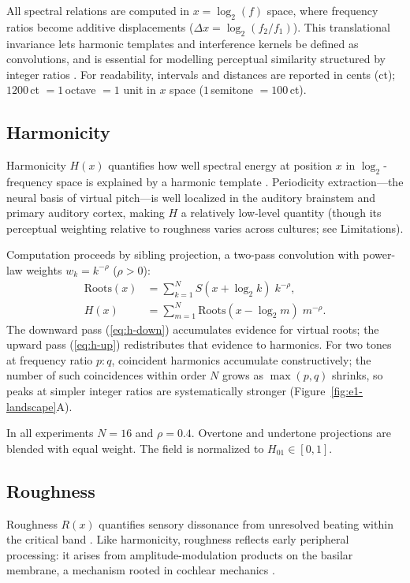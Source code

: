 \documentclass[letterpaper]{article}
\begin{document}
All spectral relations are computed in $x = \log_2(f)$ space, where frequency ratios become additive displacements ($\Delta x = \log_2(f_2/f_1)$). This translational invariance lets harmonic templates and interference kernels be defined as convolutions, and is essential for modelling perceptual similarity structured by integer ratios \citep{glasberg1990}. For readability, intervals and distances are reported in cents (ct); $1200$\,ct $= 1$\,octave $= 1$ unit in $x$ space ($1$\,semitone $= 100$\,ct).

\subsection{Harmonicity}

Harmonicity $H(x)$ quantifies how well spectral energy at position $x$ in $\log_2$-frequency space is explained by a harmonic template \citep{terhardt1979,parncutt1988}. Periodicity extraction---the neural basis of virtual pitch---is well localized in the auditory brainstem and primary auditory cortex, making $H$ a relatively low-level quantity (though its perceptual weighting relative to roughness varies across cultures; see Limitations).

Computation proceeds by sibling projection, a two-pass convolution with power-law weights $w_k=k^{-\rho}$ ($\rho>0$):
%
\begin{align}
  \mathrm{Roots}(x) &= \sum_{k=1}^{N} S(x+\log_2 k)\;k^{-\rho},
      \label{eq:h-down}\\
  H(x) &= \sum_{m=1}^{N} \mathrm{Roots}(x-\log_2 m)\;m^{-\rho}.
      \label{eq:h-up}
\end{align}
%
The downward pass (\ref{eq:h-down}) accumulates evidence for virtual roots; the upward pass (\ref{eq:h-up}) redistributes that evidence to harmonics. For two tones at frequency ratio $p\!:\!q$, coincident harmonics accumulate constructively; the number of such coincidences within order $N$ grows as $\max(p,q)$ shrinks, so peaks at simpler integer ratios are systematically stronger (Figure~\ref{fig:e1-landscape}A).

In all experiments $N=16$ and $\rho=0.4$. Overtone and undertone projections are blended with equal weight. The field is normalized to $H_{01}\in[0,1]$.

\subsection{Roughness}

Roughness $R(x)$ quantifies sensory dissonance from unresolved beating within the critical band \citep{plomp1965}. Like harmonicity, roughness reflects early peripheral processing: it arises from amplitude-modulation products on the basilar membrane, a mechanism rooted in cochlear mechanics \citep{glasberg1990}.
\end{document}

